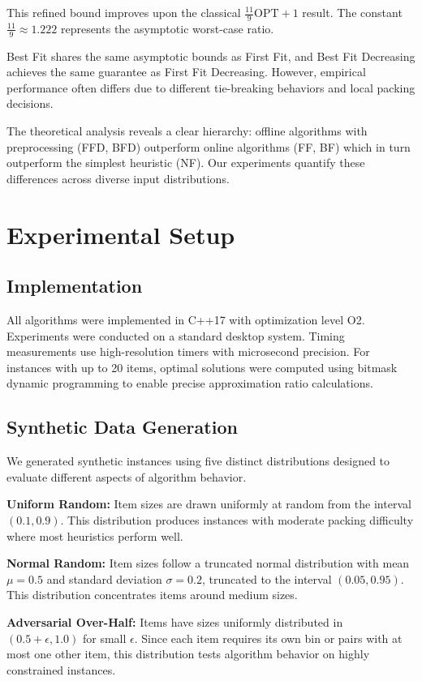 \documentclass[11pt,a4paper]{article}
\begin{document}
This refined bound improves upon the classical $\frac{11}{9}\text{OPT} + 1$ result. The constant $\frac{11}{9} \approx 1.222$ represents the asymptotic worst-case ratio.

Best Fit shares the same asymptotic bounds as First Fit, and Best Fit Decreasing achieves the same guarantee as First Fit Decreasing. However, empirical performance often differs due to different tie-breaking behaviors and local packing decisions.

The theoretical analysis reveals a clear hierarchy: offline algorithms with preprocessing (FFD, BFD) outperform online algorithms (FF, BF) which in turn outperform the simplest heuristic (NF). Our experiments quantify these differences across diverse input distributions.

\section{Experimental Setup}

\subsection{Implementation}

All algorithms were implemented in C++17 with optimization level O2. Experiments were conducted on a standard desktop system. Timing measurements use high-resolution timers with microsecond precision. For instances with up to 20 items, optimal solutions were computed using bitmask dynamic programming to enable precise approximation ratio calculations.

\subsection{Synthetic Data Generation}

We generated synthetic instances using five distinct distributions designed to evaluate different aspects of algorithm behavior.

\textbf{Uniform Random:} Item sizes are drawn uniformly at random from the interval $(0.1, 0.9)$. This distribution produces instances with moderate packing difficulty where most heuristics perform well.

\textbf{Normal Random:} Item sizes follow a truncated normal distribution with mean $\mu = 0.5$ and standard deviation $\sigma = 0.2$, truncated to the interval $(0.05, 0.95)$. This distribution concentrates items around medium sizes.

\textbf{Adversarial Over-Half:} Items have sizes uniformly distributed in $(0.5 + \epsilon, 1.0)$ for small $\epsilon$. Since each item requires its own bin or pairs with at most one other item, this distribution tests algorithm behavior on highly constrained instances.
\end{document}
